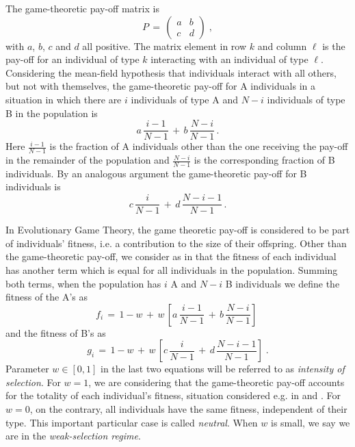 \documentclass[12pt]{article}
\begin{document}
The game-theoretic pay-off matrix is 
\begin{equation}  \label{payoffmatrix}
P \,=\,\left(\begin{array}{cc}
a&b\\
c&d
\end{array}
\right) \;,
\end{equation}
with $a$, $b$, $c$ and $d$ all positive. The matrix element in row $k$ and column $\ell$ is the pay-off for an individual of type $k$ interacting with an individual of type $\ell$. Considering the mean-field hypothesis that individuals interact with all others, but not with themselves, the game-theoretic pay-off for A individuals in a situation in which there are $i$ individuals of type A and $N-i$ individuals of type B in the population is
\[a \, \frac{i-1}{N-1} \,+\, b\, \frac{N-i}{N-1} \,.\]
Here $\frac{i-1}{N-1}$ is the fraction of A individuals other than the one receiving the pay-off in the remainder of the population and $\frac{N-i}{N-1}$ is the corresponding fraction of B individuals. By an analogous argument the game-theoretic pay-off for B individuals is
\[c \, \frac{i}{N-1} \,+\, d\, \frac{N-i-1}{N-1} \,.\]


In Evolutionary Game Theory, the game theoretic pay-off is considered to be part of individuals' fitness, i.e. a contribution to the size of their offspring. Other than the game-theoretic pay-off, we consider as in \cite{nowaknature} that the fitness of each individual has another term which is equal for all individuals in the population. Summing both terms, when the population has $i$ A and $N-i$ B individuals we define the  fitness of the A's as
\begin{equation}
\label{fi}
f_i \,=\, 1-w \,+\, w \, [a \, \frac{i-1}{N-1} \,+\, b\, \frac{N-i}{N-1}] \;
\end{equation}
and the fitness of B's as
\begin{equation}
\label{gi}
g_i \,=\, 1-w \,+\, w \, [c \, \frac{i}{N-1} \,+\, d\, \frac{N-i-1}{N-1}] \;.
\end{equation}
Parameter $w \in [0,1]$ in the last two equations will be referred to as \textit{intensity of selection}. For $w=1$, we are considering that the game-theoretic pay-off accounts for the totality of each individual's fitness, situation considered e.g. in \cite{taylor} and \cite{AntalScheuring}. For $w=0$, on the contrary, all individuals have the same fitness, independent of their type. This important particular case is called \textit{neutral}. When $w$ is small, we say we are in the \textit{weak-selection regime}.
\end{document}
